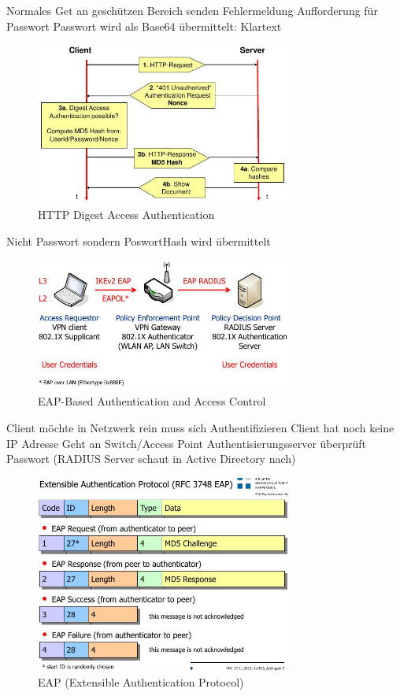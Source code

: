 \documentclass[ngerman,a4paper,12pt]{scrreprt}
\begin{document}
\ul
	\li Normales Get an geschützen Bereich senden
	\li Fehlermeldung
	\li Aufforderung für Passwort
	\li Passwort wird als Base64 übermittelt: Klartext
\ulE

\begin{figure}[H]
	\centering
	\includegraphics[width=0.75\textwidth]{img/V10.2.jpg}
	\caption{HTTP Digest Access Authentication}
	\label{}
\end{figure}

\ul
	\li Nicht Passwort sondern PoswortHash wird übermittelt
\ulE

\begin{figure}[H]
	\centering
	\includegraphics[width=0.75\textwidth]{img/V10.3.jpg}
	\caption{EAP-Based Authentication and Access Control}
	\label{}
\end{figure}

\ul
	\li Client möchte in Netzwerk rein \ra muss sich Authentifizieren
	\li Client hat noch keine IP Adresse
	\li Geht an Switch/Access Point
	\li Authentisierungsserver überprüft Passwort (RADIUS Server schaut in Active Directory nach)
\ulE

\begin{figure}[H]
	\centering
	\includegraphics[width=0.75\textwidth]{img/V10.4.jpg}
	\caption{EAP (Extensible Authentication Protocol)}
	\label{}
\end{figure}
\end{document}
